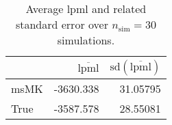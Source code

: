 \begin{table}[H]

\caption{Average lpml and related standard error over $n_{\text{sim}} = 30$ simulations.}
\centering
\begin{tabular}[t]{lrr}
\toprule
  & $\overbar{\text{lpml}}$ & $\text{sd}(\overbar{\text{lpml}})$\\
\midrule
msMK & -3630.338 & 31.05795\\
True & -3587.578 & 28.55081\\
\bottomrule
\end{tabular}
\end{table}